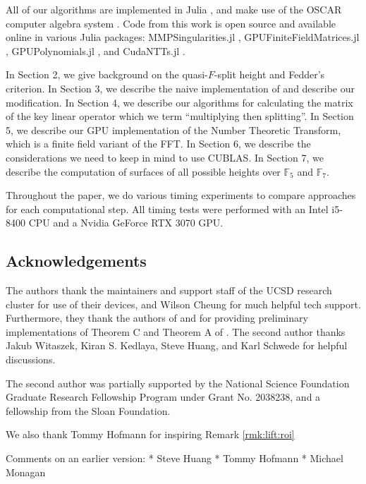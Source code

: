 All of our algorithms are implemented in Julia 
\cite{julia-2017}, and
make use of the OSCAR computer algebra system 
\cite{OSCAR-book}.
Code from this work is open source and available online 
in various
Julia packages: 
MMPSingularities.jl \cite{mmpsingularities-jl},
GPUFiniteFieldMatrices.jl \cite{gpuffmatrices-jl}, 
GPUPolynomials.jl \cite{gpupolynomials-jl},
and CudaNTTs.jl \cite{cudantts-jl}.

In Section 2, we give background on the quasi-\(F\)-split height
and Fedder's criterion.
In Section 3, we describe the naive implementation of
\cite[Theorem~C]{kty-2022-fedder} and describe
our modification.
In Section 4, we describe our algorithms for calculating the matrix
of the key linear operator which we term ``multiplying then splitting''.
In Section 5, we describe our GPU implementation of the Number Theoretic
Transform, which is a finite field variant of the FFT.
In Section 6, we describe the considerations we need to keep in mind
to use CUBLAS.
In Section 7, we describe the computation of surfaces of all possible
heights over \(\mathbb{F}_{5}\) and \(\mathbb{F}_{7}\).

Throughout the paper, we do various timing experiments to compare 
approaches for each computational step.
All timing tests were performed with 
an Intel i5-8400 CPU and a Nvidia GeForce RTX 3070 GPU.

\subsection{Acknowledgements}

The authors thank the maintainers and support staff 
of the UCSD research cluster for use of their devices,
and Wilson Cheung for much helpful tech support.
Furthermore, they thank the authors of 
\cite{kty-2022-fedder} 
and \cite{fgmqt-2025-witt-vectors-macaulay2}
for providing preliminary implementations of 
Theorem C and Theorem A
of \cite{kty-2022-fedder}.
The second author thanks Jakub Witaszek, Kiran S. Kedlaya,
Steve Huang, and Karl Schwede for helpful discussions.

The second author was partially supported by the 
National Science Foundation Graduate Research
Fellowship Program under Grant No. 2038238, and a fellowship
from the Sloan Foundation.

We also thank Tommy Hofmann for inspiring Remark \ref{rmk:lift:roi}

Comments on an earlier version:
* Steve Huang
* Tommy Hofmann
* Michael Monagan

